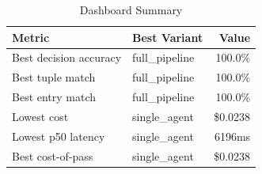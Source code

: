\begin{table}[htbp]
\centering
\caption{Dashboard Summary}
\label{tab:summary}
\begin{tabular}{l l r}
\toprule
Metric & Best Variant & Value \\
\midrule
  Best decision accuracy & full\_pipeline & 100.0\% \\
  Best tuple match & full\_pipeline & 100.0\% \\
  Best entry match & full\_pipeline & 100.0\% \\
  Lowest cost & single\_agent & \$0.0238 \\
  Lowest p50 latency & single\_agent & 6196ms \\
  Best cost-of-pass & single\_agent & \$0.0238 \\
\bottomrule
\end{tabular}
\end{table}

